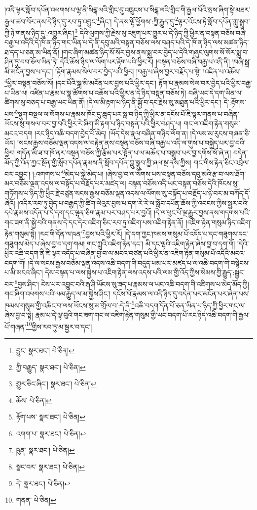 །འདི་ལྟར་སློབ་དཔོན་འཕགས་པ་ལྷ་ནི་སིངྒ་ལའི་གླིང་དུ་འཁྲུངས་པ་སིངྒ་ལའི་གླིང་གི་རྒྱལ་པོའི་སྲས་ཞིག་སྟེ་མཐར་རྒྱལ་ཚབ་བོར་ནས་དེ་ཉིད་དུ་རབ་ཏུ་འབྱུང་\footnote{བྱུང་  སྣར་ཐང་།  པེ་ཅིན། }ཞིང་། དེ་ནས་ལྷོ་ཕྱོགས་:ཀྱི་རྒྱུད་དུ་\footnote{ཀྱི་བརྒྱུད་  སྣར་ཐང་།  པེ་ཅིན། }ལྟར་འོངས་ཏེ་སློབ་དཔོན་ཀླུ་སྒྲུབ་ཀྱི་ཉེ་གནས་ཉིད་དུ་:འགྱུར་ཞིང་།\footnote{གྱུར་ཅིང་ཞིང་།  སྣར་ཐང་།  པེ་ཅིན། } དེའི་ལུགས་ཀྱི་རྗེས་སུ་འཇུག་པར་གྱུར་པ་དེ་ཉིད་ཀྱི་ཕྱིར་ན་བསྟན་བཅོས་བཞི་བརྒྱ་པ་འདིའི་དེ་ཁོ་ན་ཉིད་གང་ཡིན་པ་དེ་ནི་དབུ་མའི་བསྟན་བཅོས་ལས་བཤད་པའི་དེ་ཁོ་ན་ཉིད་ལས་མཚན་ཉིད་ཐ་དད་པ་ཅན་མ་ཡིན་ནོ། །གང་ཞིག་མཚན་ཉིད་སོ་སོར་བྱས་ནས་སྨྲ་བར་བྱེད་པ་དེའི་གཞུང་ལུགས་སོ་སོར་སྨྲ་བ་ཤིན་ཏུ་བབ་ཅོལ་ཡིན་ཏེ། དེའི་ཆོས་ཉིད་ལ་ལོག་པར་རྟོག་པའི་ཕྱིར་རོ། །བསྟན་བཅོས་བཞི་བརྒྱ་པ་འདི་ནི། །བཞི་སྒྲ་མི་མངོན་བྱས་པ་དང་། །རྟོག་རྣམས་སེལ་བར་བྱེད་པའི་ཕྱིར། །བརྒྱ་པ་ཞེས་བྱར་བརྗོད་པ་སྟེ། །འཛིན་པ་འཆོས་\footnote{ཆོས་  པེ་ཅིན། }ཕྱིར་བསྟན་བཅོས་སོ། །དང་པོའི་སྒྲ་མི་མངོན་པར་བྱས་པའི་ཕྱིར་དང་། རྟོག་པ་རྣམས་སེལ་བར་བྱེད་པའི་ཕྱིར་བརྒྱ་པ་ཡིན་ལ། འཛིན་པ་རྣམ་པ་སྣ་ཚོགས་པ་འཆོས་པའི་ཕྱིར་ན་དེ་ཉིད་བསྟན་བཅོས་ཏེ། བཞི་ཡང་དེ་དག་ཡིན་ལ་ཚིགས་སུ་བཅད་པ་བརྒྱ་ཡང་ཡིན་ནོ། །དེ་ལ་མི་རྟག་པ་ཉིད་ནི་སྐྱོ་བ་དང་རྗེས་སུ་མཐུན་པའི་ཕྱིར་དང་། དེ་:རྟོགས་པས་\footnote{རྟོག་པས་  སྣར་ཐང་།  པེ་ཅིན། }སྡུག་བསྔལ་ལ་སོགས་པ་རྣམས་ཁོང་དུ་ཆུད་པར་སླ་བ་ཉིད་ཀྱི་ཕྱིར་ན་དངོས་པོ་ཇི་ལྟར་གནས་པ་བཞིན་ཡོངས་སུ་གསལ་བར་བྱ་བའི་ཕྱིར་རེ་ཞིག་མི་རྟག་པ་ཉིད་བསྟན་པའི་ཕྱིར་བཤད་པ། གང་ལ་འཇིག་རྟེན་གསུམ་མངའ་བདག །རང་ཉིད་འཆི་བདག་བྱེད་པོ་མེད། །ཡོད་དེས་རྣལ་བཞིན་གཉིད་ལོག་ན། །དེ་ལས་མ་རུངས་གཞན་ཅི་ཡོད། །སངས་རྒྱས་བཅོམ་ལྡན་འདས་ལ་བརྟེན་ནས་བསྟན་བཅོས་བཞི་བརྒྱ་པ་འདི་ལ་གུས་པ་བསྐྱེད་པར་བྱ་བའི་ཕྱིར། གདོན་མི་ཟ་བ་ཁོ་ནར་བསྟན་བཅོས་ཀྱི་རྩོམ་པར་སྟོན་པ་ལ་མཆོད་པ་བསྒྲུབ་པར་བྱ་དགོས་སོ་ཞེ་ན། བདེན་མོད་ཀྱི་འོན་ཀྱང་སྔོན་གྱི་སློབ་དཔོན་རྣམས་ནི་སློབ་དཔོན་ཀླུ་སྒྲུབ་ཀྱི་ཞལ་སྔ་ནས་ཀྱིས། གང་གིས་རྟེན་ཅིང་འབྲེལ་བར་འབྱུང་། །:འགགས་པ་\footnote{འགག་པ་  སྣར་ཐང་།  པེ་ཅིན། }མེད་པ་སྐྱེ་མེད་པ། །ཞེས་བྱ་བ་ལ་སོགས་པས་བསྟན་བཅོས་དབུ་མའི་རྩ་བ་ལས་ཐོག་མར་བཅོམ་ལྡན་འདས་ལ་བསྟོད་པ་བརྗོད་པར་མཛད་ལ། བསྟན་བཅོས་འདི་ཡང་བསྟན་བཅོས་དེའི་ཁོངས་སུ་གཏོགས་པ་ཉིད་ཀྱི་ཕྱིར་རྗེ་བཙུན་སངས་རྒྱས་བཅོམ་ལྡན་འདས་ལ་ལོགས་སུ་བསྟོད་པ་བརྗོད་པ་ཉེ་བར་མ་བཀོད་དོ་ཞེའོ། །འདིར་རབ་ཏུ་བྱེད་པ་བརྒྱད་ཀྱི་ཚིག་ལེའུར་བྱས་པ་དག་རེ་རེ་ལ་སློབ་དཔོན་ཆོས་ཀྱི་འབངས་ཀྱིས་སྦྱར་བའི་དཔེ་རྣམས་འདོན་པ་དེ་དག་དང་ལྷན་ཅིག་རྣམ་པར་བཤད་པར་བྱའོ། །དེ་ལ་ཕུང་པོ་ལྔ་རྒྱུར་བྱས་ནས་གདགས་པའི་གང་ཟག་ནི་སྐྱེ་བའི་གནས་དེ་དང་དེར་འཇིག་ཅིང་རབ་ཏུ་འཇིག་པས་འཇིག་རྟེན་ནོ། །འཇིག་རྟེན་གསུམ་ཉིད་འཇིག་རྟེན་གསུམ་སྟེ། །རང་གི་དོན་ལ་ཥན་\footnote{ཥུན་  སྣར་ཐང་།  པེ་ཅིན། }བྱས་པའི་ཕྱིར་རོ། །དེ་དག་ཀྱང་ཁམས་གསུམ་པོ་འདོད་པ་དང་གཟུགས་དང་གཟུགས་མེད་པ་ཞེས་བྱ་བ་དག་གམ། གང་ཀླུའི་འཇིག་རྟེན་དང་། མི་དང་ལྷའི་འཇིག་རྟེན་ཞེས་བྱ་བ་དག་གོ། །དེའི་ཕྱིར་འཆི་བདག་ནི་ཇི་ལྟར་འདོད་པ་བཞིན་བྱ་བ་ལ་མངའ་བཙན་པའི་ཕྱིར་ན་འཇིག་རྟེན་གསུམ་པོ་འདིའི་མངའ་བདག་གོ། །དེ་ལ་སངས་རྒྱས་བཅོམ་ལྡན་འདས་འཆི་བདག་གི་བདུད་ཕམ་པར་མཛད་པ་ལ་འཆི་བདག་གི་བསྙེངས་པ་མི་མངའ་ཞིང་། དེས་བསྟན་པ་ལས་སྐྱེས་པ་འཇིག་རྟེན་ལས་འདས་པའི་ལམ་གྱི་འོད་ཀྱིས་སེམས་ཀྱི་རྒྱུད་:སྦྱང་བར་\footnote{སྣང་བར་  སྣར་ཐང་།  པེ་ཅིན། }བྱས་ཤིང་། ངེས་པར་འབྱུང་བའི་རྒ་ཤི་ཡོངས་སུ་ཟད་པ་རྣམས་ལ་ཡང་འཆི་བདག་གི་འཇིགས་པ་མེད་མོད་ཀྱི། གང་ཞིག་འཕགས་པའི་ལམ་རྒྱུད་ལ་མ་སྐྱེས་ཤིང་། དངོས་པོ་རྣམས་ལ་འདི་ཉིད་དུ་བདེན་པར་མངོན་པར་ཞེན་པས་ཁམས་གསུམ་གྱི་འཆིང་བ་ལས་ཡོངས་སུ་མ་གྲོལ་བ་:དེ་ནི་\footnote{དེ་  སྣར་ཐང་།  པེ་ཅིན། }འཆི་བདག་དོན་པོ་ཅན་ཡིན་པ་ཉིད་ཀྱི་ཕྱིར་གང་ལ་ཞེས་བྱ་བ་སྟེ། རྣམ་པ་དེ་ལྟ་བུའི་གང་ཟག་གང་ལ་འཇིག་རྟེན་གསུམ་གྱི་ཡང་བདག་པོ་རང་ཉིད་འཆི་བདག་གི་རྒྱལ་པོ་གཞན་\footnote{གནན་  པེ་ཅིན། }གྱིས་རབ་ཏུ་མ་སྦྱར་བ་དང་། 